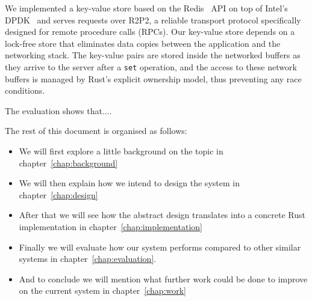 We implemented a key-value store based on the Redis~\cite{redis} API on top of
Intel's DPDK~\cite{dpdk} and serves requests over R2P2, a reliable transport
protocol specifically designed for remote procedure calls (RPCs).
Our key-value store depends on a lock-free store that eliminates data
copies between the application and the networking stack.
The key-value pairs are stored inside the networked buffers as they arrive to the server after a \texttt{set} operation,
and the access to these network buffers is managed by Rust's explicit ownership model, thus preventing any race conditions.

The evaluation shows that....

The rest of this document is organised as follows: %
\begin{itemize}
\item We will first explore a little background on the topic in
  chapter~\ref{chap:background}
\item We will then explain how we intend to design the system in
  chapter~\ref{chap:design}
\item After that we will see how the abstract design translates into a
  concrete Rust implementation in chapter~\ref{chap:implementation}
\item Finally we will evaluate how our system performs compared to
  other similar systems in chapter~\ref{chap:evaluation}.
\item And to conclude we will mention what further work could be done
  to improve on the current system in chapter~\ref{chap:work}
\end{itemize}
